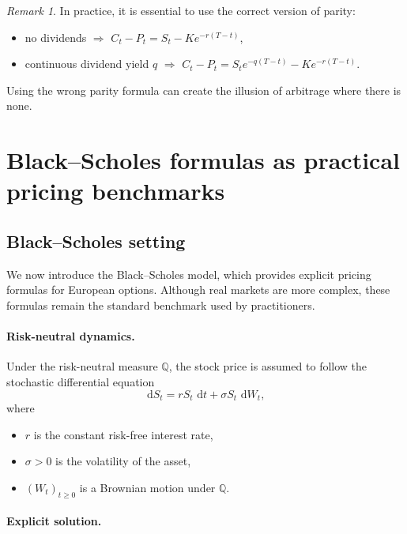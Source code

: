 \documentclass[11pt]{article}
\newcommand{\Qbb}{\mathbb{Q}}
\newcommand{\dd}{\,\mathrm{d}}
\newcommand{\1}{\mathbf{1}}
\theoremstyle{plain}
\theoremstyle{definition}
\theoremstyle{remark}
\newtheorem{remark}[theorem]{Remark}
\begin{document}
\begin{remark}
In practice, it is essential to use the correct version of parity:
\begin{itemize}[leftmargin=1.4em]
    \item no dividends \(\Rightarrow\) \(C_t-P_t=S_t-Ke^{-r(T-t)}\),
    \item continuous dividend yield \(q\) \(\Rightarrow\) \(C_t-P_t=S_t e^{-q(T-t)}-Ke^{-r(T-t)}\).
\end{itemize}
Using the wrong parity formula can create the illusion of arbitrage where there is none.
\end{remark}
\section{Black--Scholes formulas as practical pricing benchmarks}

\subsection{Black--Scholes setting}

We now introduce the Black--Scholes model, which provides explicit
pricing formulas for European options.
Although real markets are more complex, these formulas remain the
standard benchmark used by practitioners.

\paragraph{Risk-neutral dynamics.}

Under the risk-neutral measure \(\Qbb\), the stock price is assumed to follow
the stochastic differential equation
\[
\dd S_t = r S_t\,\dd t + \sigma S_t\,\dd W_t,
\]
where
\begin{itemize}[leftmargin=1.4em]
    \item \(r\) is the constant risk-free interest rate,
    \item \(\sigma>0\) is the volatility of the asset,
    \item \((W_t)_{t\ge0}\) is a Brownian motion under \(\Qbb\).
\end{itemize}

\paragraph{Explicit solution.}
\end{document}
